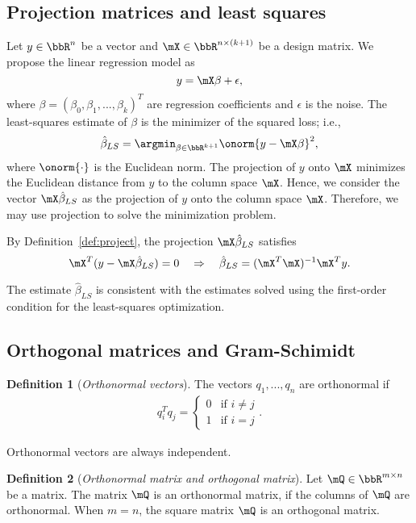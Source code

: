 \documentclass[11pt]{article}
\theoremstyle{plain}
\theoremstyle{definition}
\newtheorem{defn}{Definition}
\begin{document}
\subsection{Projection matrices and least squares}
Let $y \in \bbR^n$ be a vector and $\mX \in \bbR^{n \times (k+1)}$ be a design matrix. We propose the linear regression model as
\[ y = \mX \beta +\epsilon,\]
where $\beta = (\beta_0,\beta_1,...,\beta_k)^T$ are regression coefficients and $\epsilon$ is the noise. The least-squares estimate of $\beta$ is the minimizer of the squared loss; i.e.,
\[  \hat \beta_{LS} = \argmin_{\beta \in \bbR^{k+1}} \onorm{y - \mX \beta}^2, \]
where $\onorm{\cdot}$ is the Euclidean norm.  The projection of $y$ onto $\mX$ minimizes the Euclidean distance from $y$ to the column space $\mX$. Hence,   we consider the vector $\mX 
\hat \beta_{LS}$ as the projection of $y$ onto the column space $\mX$. Therefore, we may use projection to solve the minimization problem. 

By Definition~\ref{def:project}, the projection $\mX \hat \beta_{LS}$ satisfies
\[ \mX^T( y - \mX \hat \beta_{LS} ) = 0 \quad \Rightarrow \quad \hat \beta_{LS} = (\mX^T \mX)^{-1} \mX^T y. \]

The estimate $\hat \beta_{LS}$ is consistent with the estimates solved using the first-order condition for the least-squares optimization. 

\subsection{Orthogonal matrices and Gram-Schimidt}
\begin{defn}[\textit{Orthonormal vectors}]\label{def:othronov}
	The vectors $q_1,...,q_n$ are orthonormal if
	\begin{align}
		q_i^T q_j = \begin{cases}
			0& \text{if } i\neq j\\
			1 & \text{if } i =  j
		\end{cases}.
	\end{align}
\end{defn}

Orthonormal vectors are always independent.

\begin{defn}[\textit{Orthonormal matrix and orthogonal matrix}]\label{def:orthonom}
	Let  $\mQ \in \bbR^{m \times n}$ be a matrix. The matrix $\mQ$ is an orthonormal matrix, if the columns of $\mQ$ are orthonormal. When $ m= n$, the square matrix $\mQ$ is an orthogonal matrix.
\end{defn}
\end{document}

